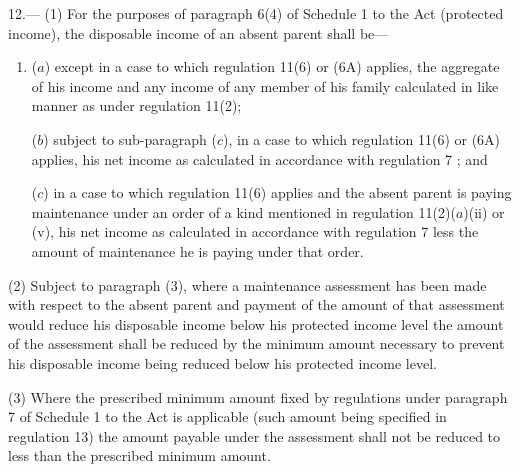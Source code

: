 \documentclass[12pt,a4paper]{article}
\begin{document}
12.—%
(1) For the purposes of paragraph 6(4) of Schedule 1 to the Act (protected income), the disposable income of an absent parent shall be—
\begin{enumerate}\item[]
($a$) except in a case to which regulation 11(6) 
or (6A)  %
applies, the aggregate of his income and any income of any member of his family calculated in like manner as under regulation 11(2); 

($b$) 
subject to sub-paragraph ($c$),  %
in a case to which regulation 11(6) 
or (6A)  %
applies, his net income as calculated in accordance with regulation 7%
; and  %

($c$) in a case to which regulation 11(6) applies and the absent parent is paying maintenance under an order of a kind mentioned in regulation 11(2)($a$)(ii) or (v), his net income as calculated in accordance with regulation 7 less the amount of maintenance he is paying under that order.
\end{enumerate}

(2) Subject to paragraph (3), where a maintenance assessment has been made with respect to the absent parent and payment of the amount of that assessment would reduce his disposable income below his protected income level the amount of the assessment shall be reduced by the minimum amount necessary to prevent his disposable income being reduced below his protected income level.

(3) Where the prescribed minimum amount fixed by regulations under paragraph 7 of Schedule 1 to the Act is applicable (such amount being specified in regulation 13) the amount payable under the assessment shall not be reduced to less than the prescribed minimum amount.
\end{document}
